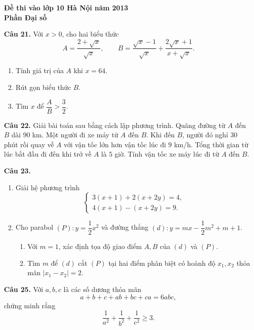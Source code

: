 \documentclass[12pt,a4paper]{article}
\begin{document}
\begin{center}\Large\bfseries Đề thi vào lớp 10 Hà Nội năm 2013\\Phần Đại số\end{center}

\textbf{Câu 21.} Với $x>0$, cho hai biểu thức
\[
A=\frac{2+\sqrt{x}}{\sqrt{x}},\qquad
B=\frac{\sqrt{x}-1}{\sqrt{x}}+\frac{2\sqrt{x}+1}{x+\sqrt{x}}.
\]
\begin{enumerate}
\item[a)] Tính giá trị của $A$ khi $x=64$.
\item[b)] Rút gọn biểu thức $B$.
\item[c)] Tìm $x$ để $\dfrac AB>\dfrac32$.
\end{enumerate}

\textbf{Câu 22.} Giải bài toán sau bằng cách lập phương trình. Quãng đường từ $A$ đến $B$ dài $90$ km. Một người đi xe máy từ $A$ đến $B$. Khi đến $B$, người đó nghỉ $30$ phút rồi quay về $A$ với vận tốc lớn hơn vận tốc lúc đi $9$ km/h. Tổng thời gian từ lúc bắt đầu đi đến khi trở về $A$ là $5$ giờ. Tính vận tốc xe máy lúc đi từ $A$ đến $B$.

\textbf{Câu 23.}
\begin{enumerate}
\item[1)] Giải hệ phương trình
\[
\begin{cases}
3(x+1)+2(x+2y)=4,\\
4(x+1)-(x+2y)=9.
\end{cases}
\]
\item[2)] Cho parabol $(P):y=\dfrac12x^2$ và đường thẳng $(d):y=mx-\dfrac12m^2+m+1$.
\begin{enumerate}
\item Với $m=1$, xác định tọa độ giao điểm $A,B$ của $(d)$ và $(P)$.
\item Tìm $m$ để $(d)$ cắt $(P)$ tại hai điểm phân biệt có hoành độ $x_1,x_2$ thỏa mãn $|x_1-x_2|=2$.
\end{enumerate}
\end{enumerate}

\textbf{Câu 25.} Với $a,b,c$ là các số dương thỏa mãn
\[
a+b+c+ab+bc+ca=6abc,
\]
chứng minh rằng
\[
\frac1{a^2}+\frac1{b^2}+\frac1{c^2}\ge 3.
\]
\end{document}
